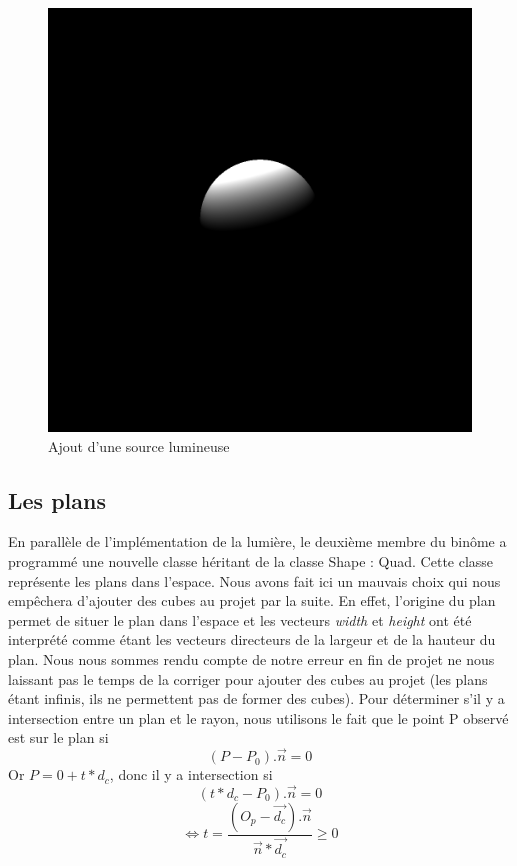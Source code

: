 \documentclass[11pt, oneside]{article}   	%
\begin{document}
\begin{figure}
    \centering
    \includegraphics[scale=0.2]{rapport/result 2.png}
    \caption{Ajout d'une source lumineuse}
    \label{fig:my_label}
\end{figure}

\subsection{Les plans}
En parallèle de l'implémentation de la lumière, le deuxième membre du binôme a programmé une nouvelle classe héritant de la classe Shape : Quad. Cette classe représente les plans dans l'espace. Nous avons fait ici un mauvais choix qui nous empêchera d'ajouter des cubes au projet par la suite. En effet, l'origine du plan permet de situer le plan dans l'espace et les vecteurs \textit{width} et \textit{height} ont été interprété comme étant les vecteurs directeurs de la largeur et de la hauteur du plan. Nous nous sommes rendu compte de notre erreur en fin de projet ne nous laissant pas le temps de la corriger pour ajouter des cubes au projet (les plans étant infinis, ils ne permettent pas de former des cubes).
Pour déterminer s'il y a intersection entre un plan et le rayon, nous utilisons le fait que le point P observé est sur le plan si 
$$(P-P_0).\vec{n} = 0$$
Or $P = 0 + t*d_c$, donc il y a intersection si
$$(t*d_c-P_0).\vec{n} = 0$$
$$\iff t = \frac{(O_p - \vec{d_c}).\vec{n}}{\vec{n}*\vec{d_c}} \geq 0$$
\end{document}
